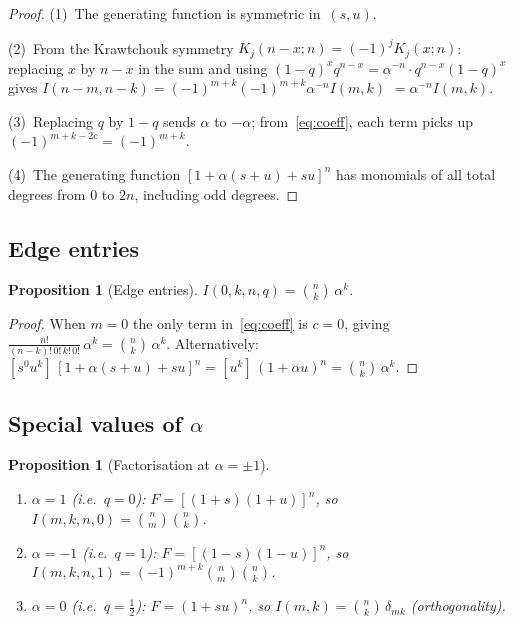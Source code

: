 \documentclass[11pt,a4paper]{article}
\theoremstyle{plain}
\newtheorem{proposition}[theorem]{Proposition}
\theoremstyle{definition}
\begin{document}
\begin{proof}
(1)~The generating function is symmetric in~$(s, u)$.

(2)~From the Krawtchouk symmetry
$K_j(n-x; n) = (-1)^j K_j(x; n)$: replacing $x$ by $n-x$ in the
sum and using $(1-q)^x q^{n-x} = \alpha^{-n} \cdot
q^{n-x}(1-q)^x$ gives
$I(n{-}m, n{-}k) = (-1)^{m+k} (-1)^{m+k} \alpha^{-n} I(m,k)$
$= \alpha^{-n} I(m,k)$.

(3)~Replacing $q$ by $1-q$ sends $\alpha$ to $-\alpha$;
from~\eqref{eq:coeff}, each term picks up $(-1)^{m+k-2c}
= (-1)^{m+k}$.

(4)~The generating function $[1 + \alpha(s+u) + su]^n$ has monomials
of all total degrees from $0$ to $2n$, including odd degrees.
\end{proof}

\subsection{Edge entries}

\begin{tcolorbox}[colback=black!5, colframe=black!5, boxrule=0pt,
  sharp corners]
\begin{proposition}[Edge entries]\label{prop:edge}
$I(0, k, n, q) = \binom{n}{k}\, \alpha^k$.
\end{proposition}
\end{tcolorbox}

\begin{proof}
When $m = 0$ the only term in~\eqref{eq:coeff} is $c = 0$, giving
$\frac{n!}{(n-k)!\,0!\,k!\,0!}\, \alpha^k = \binom{n}{k}\, \alpha^k$.
Alternatively: $[s^0 u^k]\, [1 + \alpha(s+u) + su]^n
= [u^k]\, (1 + \alpha u)^n = \binom{n}{k}\, \alpha^k$.
\end{proof}

\subsection{Special values of $\alpha$}

\begin{tcolorbox}[colback=black!5, colframe=black!5, boxrule=0pt,
  sharp corners]
\begin{proposition}[Factorisation at $\alpha = \pm 1$]
\label{prop:factor}
\mbox{}
\begin{enumerate}
\item $\alpha = 1$ (i.e.\ $q = 0$):
  $F = [(1+s)(1+u)]^n$, so $I(m, k, n, 0) = \binom{n}{m}\binom{n}{k}$.
\item $\alpha = -1$ (i.e.\ $q = 1$):
  $F = [(1-s)(1-u)]^n$, so
  $I(m, k, n, 1) = (-1)^{m+k}\binom{n}{m}\binom{n}{k}$.
\item $\alpha = 0$ (i.e.\ $q = \tfrac12$):
  $F = (1 + su)^n$, so $I(m, k) = \binom{n}{k}\,\delta_{mk}$
  (orthogonality).
\end{enumerate}
\end{proposition}
\end{tcolorbox}
\end{document}
